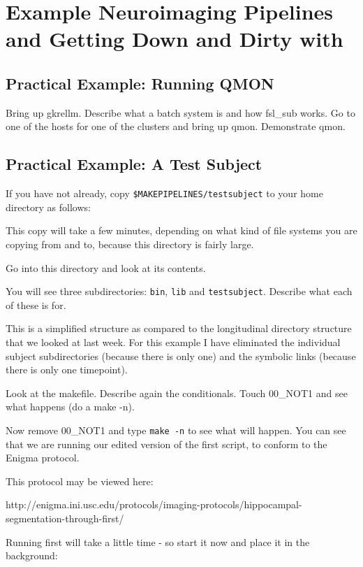\chapter{ Example Neuroimaging Pipelines and Getting Down and Dirty with \maken{}}

\section{Practical Example: Running QMON }

Bring up gkrellm. 
Describe what a batch system is and how fsl_sub works.
Go to one of the hosts for one of the clusters and bring up qmon. Demonstrate qmon. 

\section{Practical Example: A Test Subject}
If you have not already, copy \texttt{\$MAKEPIPELINES/testsubject} to your home directory as follows:

This copy will take a few minutes, depending on what kind of file systems you are copying from and to, because this directory is fairly large.

Go into this directory and look at its contents.

You will see three subdirectories: \texttt{bin}, \texttt{lib} and \texttt{testsubject}. 
Describe what each of these is for. 

This is a simplified structure as compared to the longitudinal directory structure that we looked at last week. For this example I have eliminated the individual subject subdirectories (because there is only one) and the symbolic links (because there is only one timepoint).

Look at the makefile. Describe again the conditionals. Touch 00_NOT1 and see what happens (do a make -n).

Now remove 00_NOT1 and type \texttt{make -n} to see what will happen. You can see that we are running our edited version of the first script, to conform to the Enigma protocol. 

This protocol may be viewed here:

http://enigma.ini.usc.edu/protocols/imaging-protocols/hippocampal-segmentation-through-first/

Running first will take a little time - so start it now and place it in the background:

